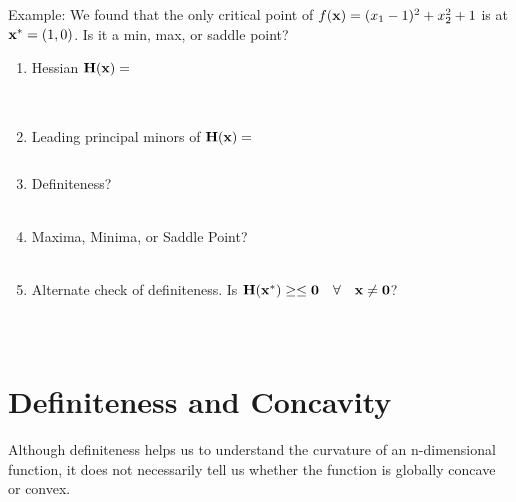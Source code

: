 \documentclass[]{book}
\newcommand{\fx}{f({\bf x})}
\theoremstyle{definition}
\theoremstyle{definition}
\theoremstyle{definition}
\theoremstyle{remark}
\begin{document}
\medskip

Example: We found that the only critical point of
\(\fx=(x_1-1)^2+x_2^2+1\) is at \({\bf x}^*=(1,0)\). Is it a min, max,
or saddle point?

\begin{enumerate}
  \item Hessian $\bf H({\bf x})=$
    $$\phantom{\begin{pmatrix} 2&0\\0&2 \end{pmatrix}}$$
 \item Leading principal minors of $\bf H({\bf x})=$
    $$\phantom{M_1=2; M_2=4}$$
 \item Definiteness?\\
    \phantom{Since both leading principal minors are positive, the 
    Hessian is positive definite}\\
 \item Maxima, Minima, or Saddle Point?\\
    \phantom{Since the hessian is positive definite and the gradient 
    equals 0, $x^8 = (1,0)$ is a strict local minimum.}\\
 \item Alternate check of definiteness. Is $\bf H({\bf x}^*) \ge \le 0 
 \quad \forall \quad \bf x\ne 0$?\\
    $$\phantom{{\bf x^T H({\bf x}^*) x} = \begin{pmatrix} x_1 & x_2 
    \end{pmatrix} \begin{pmatrix} 2&0\\0&2 \end{pmatrix}
    \begin{pmatrix} x_1\\x_2\end{pmatrix} = 2x_1^2+2x_2^2}$$
    
\end{enumerate}

\section{Definiteness and Concavity}\label{definiteness-and-concavity}

Although definiteness helps us to understand the curvature of an
n-dimensional function, it does not necessarily tell us whether the
function is globally concave or convex.
\end{document}
